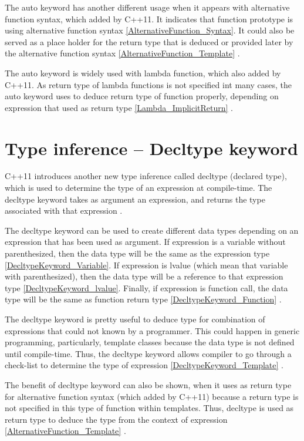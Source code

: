 \documentclass[11pt]{report}
\begin{document}
The auto keyword has another different usage when it appears with alternative function syntax, which added by C++11. It indicates that function prototype is using alternative function syntax \ref{AlternativeFunction_Syntax}. It could also be served as a place holder for the return type that is deduced or provided later by the alternative function syntax \ref{AlternativeFunction_Template} \cite{Prata:2012:Cpp}.


The auto keyword is widely used with lambda function, which also added by C++11. As return type of lambda functions is not specified int many cases, the auto keyword uses to deduce return type of function properly, depending on expression that used as return type \ref{Lambda_ImplicitReturn} \cite{Gregorie:professionalcpp}.

\section{Type inference – Decltype keyword}
\label{section: Decltype keyword}
C++11 introduces another new type inference called decltype (declared type), which is used to determine the type of an expression at compile-time. The decltype keyword takes as argument an expression, and returns the type associated with that expression \cite{Stroustrup:2012:Cpp11}. 


The decltype keyword can be used to create different data types depending on an expression that has been used as argument.  If expression is a variable without parenthesized, then the data type will be the same as the expression type \ref{DecltypeKeyword_Variable}. If expression is lvalue (which mean that variable with parenthesized), then the data type will be a reference to that expression type \ref{DecltypeKeyword_lvalue}. Finally, if expression is function call, the data type will be the same as function return type \ref{DecltypeKeyword_Function} \cite{Prata:2012:Cpp}.


The decltype keyword is pretty useful to deduce type for combination of expressions that could not known by a programmer. This could happen in generic programming, particularly, template classes because the data type is not defined until compile-time. Thus, the decltype keyword allows compiler to go through a check-list to determine the type of expression \ref{DecltypeKeyword_Template} \cite{Stroustrup:2012:Cpp11}.


The benefit of decltype keyword can also be shown, when it uses as return type for alternative function syntax (which added by C++11) because a return type is not specified in this type of function within templates. Thus, decltype is used as return type to deduce the type from the context of expression \ref{AlternativeFunction_Template} \cite{Gregorie:professionalcpp}. 
\end{document}
